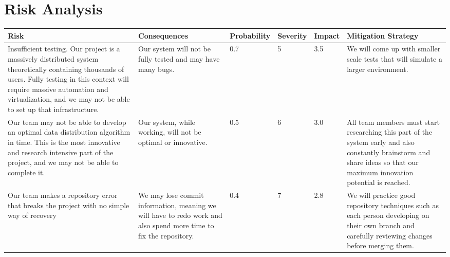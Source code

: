 \chapter{Risk Analysis}

\hspace*{-2cm}
\begin{tabular}{p{5cm} | p{3cm} | l | l | l | p{4cm}}
\hline

Risk & Consequences & Probability & Severity & Impact & Mitigation Strategy \\

\hline

Insufficient testing.  Our project is a massively distributed system theoretically containing thousands of users.  Fully testing in this context will require massive automation and virtualization, and we may not be able to set up that infrastructure. & Our system will not be fully tested and may have many bugs. & 0.7 & 5 & 3.5 & We will come up with smaller scale tests that will simulate a larger environment. \\

\hline

Our team may not be able to develop an optimal data distribution algorithm in time.  This is the most innovative and research intensive part of the project, and we may not be able to complete it. & Our system, while working, will not be optimal or innovative. & 0.5 & 6 & 3.0 & All team members must start researching this part of the system early and also constantly brainstorm and share ideas so that our maximum innovation potential is reached. \\

\hline

Our team makes a repository error that breaks the project with no simple way of recovery & We may lose commit information, meaning we will have to redo work and also spend more time to fix the repository. & 0.4 & 7 & 2.8 & We will practice good repository techniques such as each person developing on their own branch and carefully reviewing changes before merging them. \\

\hline

\end{tabular}
\hspace*{-2cm}